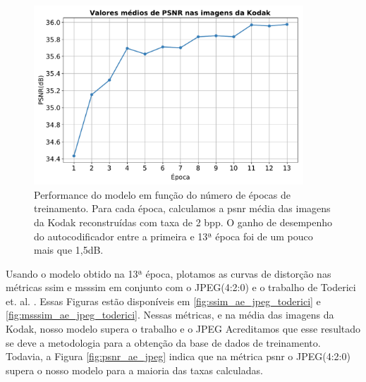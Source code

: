 \begin{figure}
	\centering
	\includegraphics[width=0.9\textwidth]{figuras/psnr_13epochs.pdf}
	\caption[Performance do modelo em função do número de épocas de treinamento]{Performance do modelo em função do número de épocas de treinamento. Para cada época, calculamos a \acrshort{psnr} média das imagens da Kodak reconstruídas com taxa de 2 bpp.  O ganho de desempenho do autocodificador entre a primeira e 13ª época foi de um pouco mais que 1,5dB.}
	\label{fig:psnr_13epocas}
\end{figure}		

Usando o modelo obtido na 13ª época, plotamos as curvas de distorção nas métricas \acrshort{ssim} e \acrshort{msssim} em conjunto com o JPEG(4:2:0) e o trabalho de Toderici et. al. \cite{FullResolution2017Toderici}. Essas Figuras estão disponíveis em \ref{fig:ssim_ae_jpeg_toderici} e  \ref{fig:msssim_ae_jpeg_toderici}. 
Nessas métricas, e na média das imagens da Kodak, nosso modelo supera o trabalho \cite{FullResolution2017Toderici} e o JPEG
Acreditamos que esse resultado se deve a metodologia para a obtenção da base de dados de treinamento.
Todavia, a Figura \ref{fig:psnr_ae_jpeg} indica que na métrica \acrshort{psnr} o JPEG(4:2:0) supera o nosso modelo para a maioria das taxas calculadas. 

